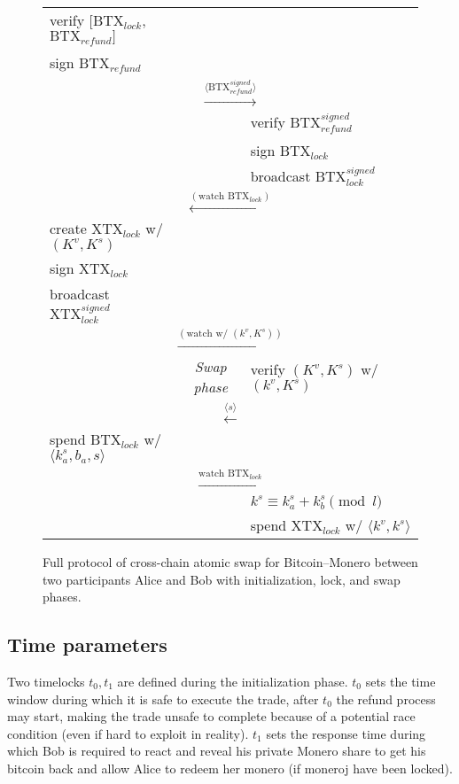 \documentclass{llncs}
\begin{document}
\begin{figure}[H]
\begin{table}[H]
{\begin{tabular}{ | l c l | }
          verify $[\text{BTX}_\textit{lock}$, $\text{BTX}_\textit{refund}]$ & & \\
          sign $\text{BTX}_\textit{refund}$ & & \\
          \multicolumn{3}{|c|}{$\xrightarrow{\langle \text{BTX}_\textit{refund}^\textit{signed} \rangle}$} \\
          & & verify $\text{BTX}_\textit{refund}^\textit{signed}$ \\
          & & sign $\text{BTX}_\textit{lock}$ \\
          & & broadcast $\text{BTX}_\textit{lock}^\textit{signed}$ \\
          \multicolumn{3}{|c|}{$\xleftarrow{(\text{watch BTX}_\textit{lock})}$} \\
          create $\text{XTX}_\textit{lock}$ w/ $(K^v, K^s)$ & & \\
          sign $\text{XTX}_\textit{lock}$ & & \\
          broadcast $\text{XTX}_\textit{lock}^\textit{signed}$ & & \\
          \multicolumn{3}{|c|}{$\xrightarrow{(\text{watch w/ } (k^v, K^s))}$} \\
          & \textit{Swap phase} & verify $(K^v, K^s)$ w/ $(k^v, K^s)$ \\
          \multicolumn{3}{|c|}{$\xleftarrow{\langle s \rangle}$} \\
          spend $\text{BTX}_\textit{lock}$ w/ $\langle k^s_a, b_a, s \rangle$ & & \\
          \multicolumn{3}{|c|}{$\xrightarrow{\text{watch BTX}_\textit{lock}}$} \\
          & & $k^s \equiv k^s_a + k^s_b \pmod l$ \\
          & & spend $\text{XTX}_\textit{lock}$ w/ $\langle k^v, k^s \rangle$ \\
        \hline
      \end{tabular}}
    \end{table}
  \caption{Full protocol of cross-chain atomic swap for Bitcoin--Monero between two participants Alice and Bob with initialization, lock, and swap phases.}
  \label{fig:protocol}
\end{figure}

\subsection{Time parameters}
Two timelocks $t_0, t_1$ are defined during the initialization phase. $t_0$ sets the time window during which it is safe to execute the trade, after $t_0$ the refund process may start, making the trade unsafe to complete because of a potential race condition (even if hard to exploit in reality). $t_1$ sets the response time during which Bob is required to react and reveal his private Monero share to get his bitcoin back and allow Alice to redeem her monero (if moneroj have been locked).
\end{document}
